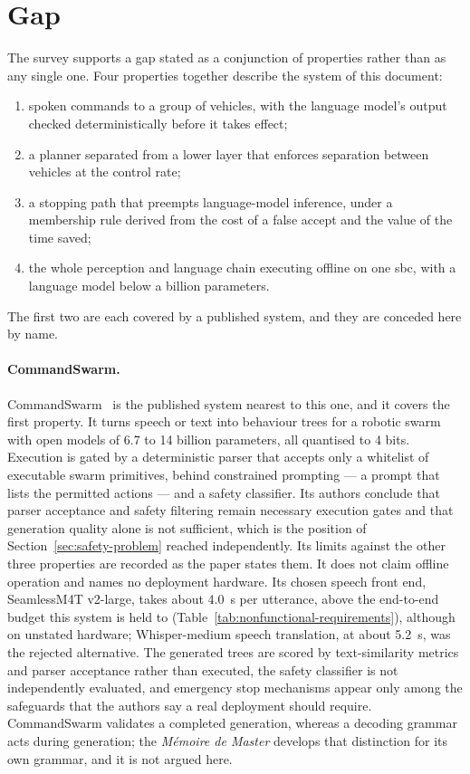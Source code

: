 \section{Gap}
\label{sec:gap}
The survey supports a gap stated as a conjunction of properties rather than as any single one. Four
properties together describe the system of this document:
\begin{enumerate}
  \item spoken commands to a group of vehicles, with the language model's output checked
        deterministically before it takes effect;
  \item a planner separated from a lower layer that enforces separation between vehicles at the
        control rate;
  \item a stopping path that preempts language-model inference, under a membership rule derived
        from the cost of a false accept and the value of the time saved;
  \item the whole perception and language chain executing offline on one \gls{sbc},
        with a language model below a billion parameters.
\end{enumerate}
The first two are each covered by a published system, and they are conceded here by name.

\paragraph{CommandSwarm.} CommandSwarm~\cite{commandswarm2026} is the published system nearest to
this one, and it covers the first property. It turns speech or text into behaviour trees for a
robotic swarm with open models of 6.7 to 14 billion parameters, all quantised to 4 bits. Execution
is gated by a deterministic parser that accepts only a whitelist of executable swarm primitives,
behind constrained prompting --- a prompt that lists the permitted actions --- and a safety
classifier. Its authors conclude that parser acceptance and safety filtering remain necessary
execution gates and that generation quality alone is not sufficient, which is the position of
Section~\ref{sec:safety-problem} reached independently. Its limits against the other three
properties are recorded as the paper states them. It does not claim offline operation and names no
deployment hardware. Its chosen speech front end, SeamlessM4T v2-large, takes about 4.0~s per
utterance, above the end-to-end budget this system is held to
(Table~\ref{tab:nonfunctional-requirements}), although on unstated hardware; Whisper-medium speech
translation, at about 5.2~s, was the rejected alternative. The generated trees are scored by
text-similarity metrics and parser acceptance rather than executed, the safety classifier is not
independently evaluated, and emergency stop mechanisms appear only among the safeguards that the
authors say a real deployment should require. CommandSwarm validates a completed generation, whereas
a decoding grammar acts during generation; the \emph{M\'emoire de Master} develops that distinction
for its own grammar, and it is not argued here.

